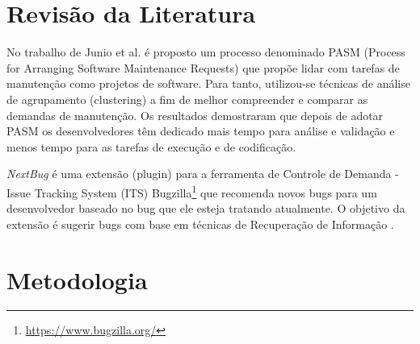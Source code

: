 \documentclass[msc,proposal,hidelot,hideabstract]{ppgccufmg} %
\begin{document}
%
\chapter{Revisão da Literatura}
\label{ch:revisao}

No trabalho de Junio et al. \cite{5741246} é proposto um processo denominado PASM (Process for Arranging
Software Maintenance Requests) que propõe lidar com tarefas de manutenção como
projetos de software. Para tanto, utilizou-se técnicas de análise de
agrupamento (clustering) a fim de melhor compreender e comparar as demandas de
manutenção. Os resultados demostraram que depois de adotar PASM os
desenvolvedores têm dedicado mais tempo para análise e validação e menos tempo
para as tarefas de execução e de codificação.

\textit{NextBug} \cite{101186} é uma extensão (plugin) para a ferramenta de Controle de Demanda -
Issue Tracking System (ITS) Bugzilla\footnote{\url{https://www.bugzilla.org/}}
que recomenda novos bugs para um desenvolvedor baseado no bug que ele esteja
tratando atualmente. O objetivo da extensão é sugerir bugs com base em técnicas de
Recuperação de Informação \cite{baeza1999modern}.

\chapter{Metodologia}
\label{ch:metodologia}
\end{document}

